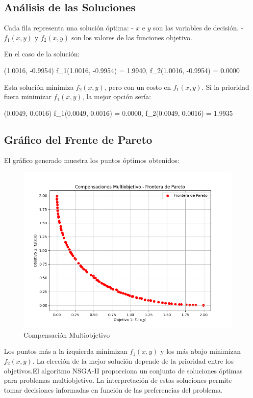 \documentclass[12pt]{article}
\begin{document}
\subsection*{Análisis de las Soluciones}

Cada fila representa una solución óptima:
- $x$ e $y$ son las variables de decisión.
- $f_1(x,y)$ y $f_2(x,y)$ son los valores de las funciones objetivo.

En el caso de la solución:
\begin{center}
	(1.0016, -0.9954) \Rightarrow f_1(1.0016, -0.9954) = 1.9940, \quad f_2(1.0016, -0.9954) = 0.0000
\end{center}

Esta solución minimiza $f_2(x,y)$, pero con un costo en $f_1(x,y)$. Si la prioridad fuera minimizar $f_1(x,y)$, la mejor opción sería:
\begin{center}
	(0.0049, 0.0016) \Rightarrow f_1(0.0049, 0.0016) = 0.0000, \quad f_2(0.0049, 0.0016) = 1.9935
\end{center}

\subsection*{Gráfico del Frente de Pareto}

El gráfico generado muestra los puntos óptimos obtenidos:

\begin{figure}[H]
	\centering
	\includegraphics[width=0.9\linewidth]{Figure_2.png}
	\caption{Compensación Multiobjetivo}
	\label{fig:frente-pareto}
\end{figure}

Los puntos más a la izquierda minimizan $f_1(x,y)$ y los más abajo minimizan $f_2(x,y)$. La elección de la mejor solución depende de la prioridad entre los objetivos.El algoritmo NSGA-II proporciona un conjunto de soluciones óptimas para problemas multiobjetivo. La interpretación de estas soluciones permite tomar decisiones informadas en función de las preferencias del problema.
\end{document}
